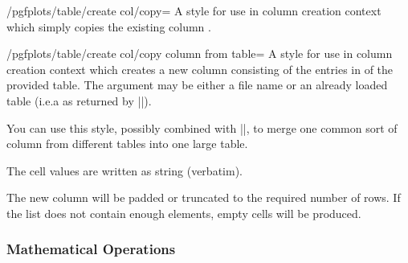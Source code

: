 \begin{stylekey}{/pgfplots/table/create col/copy=}
    A style for use in column creation context which simply copies the existing
    column .
\begin{codeexample}[pre={\begin{lateximage}},post={\end{lateximage}}]

\end{codeexample}
\end{stylekey}

\begin{stylekey}{/pgfplots/table/create col/copy column from table=}
    A style for use in column creation context which creates a new column
    consisting of the entries in  of the provided table. The
    argument may be either a file name or an already loaded table (i.e.\@ a
     as returned by |\pgfplotstableread|).

    You can use this style, possibly combined with |\pgfplotstablenew|, to
    merge one common sort of column from different tables into one large table.

    The cell values are written as string (verbatim).

    \noindent The new column will be padded or truncated to the required number
    of rows. If the list does not contain enough elements, empty cells will be
    produced.
\end{stylekey}


\subsubsection{Mathematical Operations}

